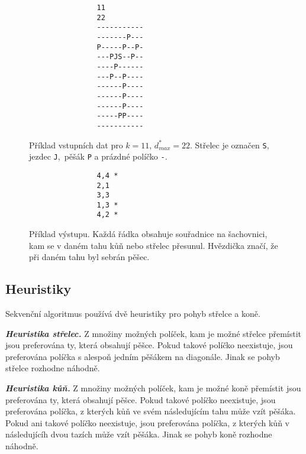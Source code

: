 \documentclass{article}
\newcommand{\heuristika}[1]{\textbf{\textit{Heuristika {#1}.}}}
\begin{document}
    \begin{figure}[h]
        \begin{center}
            \begin{BVerbatim}
                11
                22
                -----------
                -------P---
                P-----P--P-
                ---PJS--P--
                ----P------
                ---P--P----
                ------P----
                ------P----
                ------P----
                -----PP----
                -----------
            \end{BVerbatim}
        \end{center}
        \cprotect\caption{ Příklad vstupních dat pro $k=11$, $d^{*}_{max}=22$. Střelec je označen \verb|S|, jezdec \verb|J|,\
            pěšák \verb|P| a prázdné políčko \verb|-|. }
        \label{fig:board-example}
    \end{figure}

    \begin{figure}[h]
        \begin{center}
            \begin{BVerbatim}
                4,4 *
                2,1
                3,3
                1,3 *
                4,2 *
            \end{BVerbatim}
        \end{center}
        \caption{Příklad výstupu. Každá řádka obsahuje souřadnice na šachovnici, kam se v daném tahu kůň nebo střelec přesunul. Hvězdička značí, že při daném tahu byl sebrán pěšec.}
        \label{fig:output-example}
    \end{figure}


    \pagebreak
    \label{subsec:seq-heuristics}


    \subsection{Heuristiky}
    Sekvenční algoritmus používá dvě heuristiky pro pohyb střelce a koně.

    \heuristika{střelec} Z množiny možných políček, kam je možné střelce přemístit jsou preferována ty,
    která obsahují pěšce. Pokud takové políčko neexistuje, jsou preferována políčka s alespoň jedním pěšákem
    na diagonále. Jinak se pohyb střelce rozhodne náhodně.
    \hspace{1.5pt}

    \heuristika{kůň} Z množiny možných políček, kam je možné koně přemístit jsou preferována ty,
    která obsahují pěšce. Pokud takové políčko neexistuje, jsou preferována políčka, z kterých
    kůň ve svém následujícím tahu může vzít pěšáka. Pokud ani takové políčko neexistuje, jsou
    preferována políčka, z kterých kůň v následujícíh dvou tazích může vzít pěšáka.
    Jinak se pohyb koně rozhodne náhodně.
\end{document}
